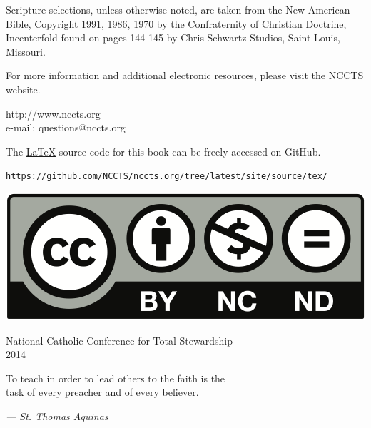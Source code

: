 \documentclass[oneside]{book}
\begin{document}
Scripture selections, unless otherwise noted, are taken from the New American
Bible, Copyright 1991, 1986, 1970 by the Confraternity of Christian Doctrine,
Incenterfold found on pages 144-145 by Chris Schwartz Studios, Saint Louis,
Missouri.

For more information and additional electronic resources, please visit the NCCTS
website.

\begin{center}

http://www.nccts.org \\
e-mail: questions@nccts.org

The \href{http://www.latex-project.org/}{\LaTeX} source code for this book can
be freely accessed on GitHub.

\texttt{\href{https://github.com/NCCTS/nccts.org/tree/latest/site/source/tex/}
             {https://github.com/NCCTS/nccts.org/tree/latest/site/source/tex/}}

\href{https://creativecommons.org/licenses/by-nc/3.0/us/}{
  \includegraphics[scale=0.4]{by-nc-nd}
}

\end{center}

\vfill
\begin{center}

{\small National Catholic Conference for Total Stewardship \\ 2014}

\end{center}
\clearpage
\pagebreak


\vspace*{\fill}
\begin{center}

To teach in order to lead others to the faith is the \\ task of every preacher
and of every believer.

\emph{--- St. Thomas Aquinas}

\end{center}
\vspace*{\fill}
\pagebreak
\end{document}
